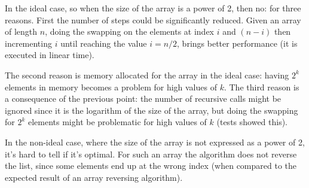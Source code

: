 \documentclass[12pt]{article}
\begin{document}
In the ideal case, so when the size of the array is a power of 2, then no: for three reasons. First the number of steps could 
be significantly reduced. Given an array of length $n$, doing the swapping on the elements at index $i$ and $(n-i)$ then incrementing $i$ until reaching the value $i = n/2$, brings better performance (it is executed in linear time). 

The second reason is memory allocated for the array in the ideal case: having $2^k$ elements in memory becomes a problem for 
high values of $k$. The third reason is a consequence of the previous point: the number of recursive calls might be ignored since it is the logarithm of the size of the array, but doing the swapping for $2^k$ elements might be problematic for high values of $k$ (tests showed this).
\vspace{.4cm}

In the non-ideal case, where the size of the array is not expressed as a power of 2, it's hard to tell if it's optimal. For such an array the algorithm does not reverse the list, since some elements end up at the wrong index (when compared to the 
expected result of an array reversing algorithm). 	

\end{document}
